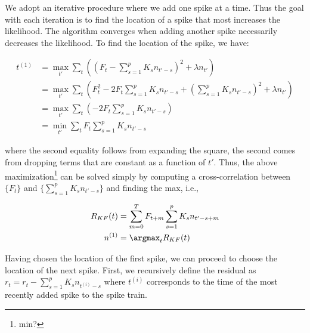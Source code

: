 \documentclass{article}
\begin{document}
We adopt an iterative procedure where we add one spike at a time.  Thus the goal with each iteration is to find the location of a spike that most increases the likelihood.  The algorithm converges when adding another spike necessarily decreases the likelihood.  To find the location of the spike, we have:

\begin{align}
t^{(1)} &= \max_{t'} \sum_t \left( \left(F_t - \sum_{s=1}^p K_s n_{t'-s}\right)^2 + \lambda n_{t'}\right) \\
&= \max_{t'} \sum_t \left( F_t^2 - 2 F_t  \sum_{s=1}^p K_s n_{t'-s} + ( \sum_{s=1}^p K_s n_{t'-s})^2  + \lambda n_{t'}\right) \\
&= \max_{t'} \sum_t \left(- 2 F_t  \sum_{s=1}^p K_s n_{t'-s}\right)\\
&= \min_{t'} \sum_t F_t \sum_{s=1}^p K_s n_{t'-s}
\end{align}

\noindent where the second equality follows from expanding the square, the second comes from dropping terms that are constant as a function of $t'$.  Thus, the above maximization\footnote{min?} can be solved simply by computing a cross-correlation between $\{F_t\}$ and  $\{\sum_{s=1}^p K_s n_{t'-s}\}$ and finding the max, i.e.,

\begin{align}
R_{KF}(t) &= \sum_{m=0}^T F_{t+m} \sum_{s=1}^p K_s n_{t'-s+m}\\
n^{(1)} &= \argmax_t R_{KF} (t) 
\end{align}

Having chosen the location of the first spike, we can proceed to choose the location of the next spike.  First, we recursively define the residual as $r_t = r_t - \sum_{s=1}^p K_s n_{t^{(i)}-s}$ where $t^{(i)}$ corresponds to the time of the most recently added spike to the spike train.  
\end{document}
